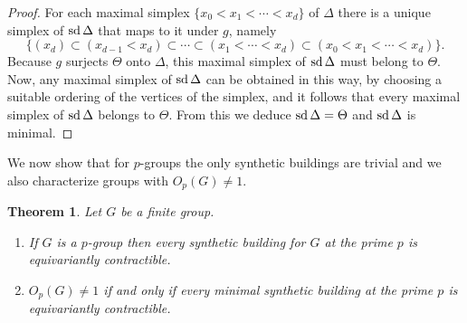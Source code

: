 \documentclass[12pt]{amsart}
\theoremstyle{plain}
\newtheorem{theorem}{Theorem}[section]
\theoremstyle{definition}
\theoremstyle{remark}
\numberwithin{equation}{section}
\def \sd{\mathop{\rm sd}}
\begin{document}
\begin{proof}
For each maximal simplex $\{x_0<x_1<\cdots <x_d\}$ of $\Delta$ there is a unique simplex of $\sd \Delta$ that maps to it under $g$, namely
$$\{(x_d) \subset (x_{d-1}< x_d)\subset\cdots\subset (x_1<\cdots <x_d)\subset (x_0<x_1<\cdots <x_d)\}.$$
Because $g$ surjects $\Theta$ onto $\Delta$, this maximal simplex of $\sd\Delta$ must belong to $\Theta$. Now, any maximal simplex of $\sd\Delta$ can be obtained in this way, by choosing a suitable ordering of the vertices of the simplex, and it follows that every maximal simplex of $\sd\Delta$ belongs to $\Theta$. From this we deduce $\sd\Delta=\Theta$ and $\sd\Delta$ is minimal.
\end{proof}

We now show that for $p$-groups the only synthetic buildings are trivial and we also characterize groups with $O_p(G)\ne 1$.

\begin{theorem}
\label{p-group-theorem}
Let $G$ be a finite group.
\begin{enumerate}
    \item If $G$ is a $p$-group then every synthetic building for $G$ at the prime $p$ is equivariantly contractible.
    \item $O_p(G)\ne 1$ if and only if every minimal synthetic building at the prime $p$ is equivariantly contractible.
\end{enumerate}
\end{theorem} 
\end{document}
